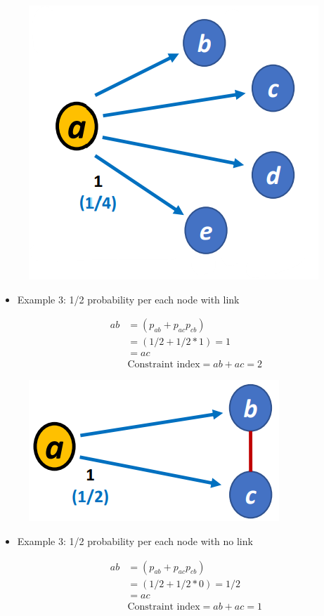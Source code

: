 \documentclass[
  notitlepage,
  onecolumn,
  openany]{book}
\begin{document}
\begin{figure}[h!]

{\centering \includegraphics[width=0.4\linewidth]{images/08-Metrics for structural holes/Untitled 1} 

}

\end{figure}

\begin{itemize}
\item
  Example 3: 1/2 probability per each node with link

  \[
    \begin{aligned}
    ab &= (p_{ab}+p_{ac}p_{cb})
    \\&= (1/2+1/2*1)=1\\
    & = ac\\
    &\text{Constraint index} = ab+ac= 2
    \end{aligned}
    \]
\end{itemize}

\begin{figure}[h!]

{\centering \includegraphics[width=0.4\linewidth]{images/08-Metrics for structural holes/Untitled 2} 

}

\end{figure}

\begin{itemize}
\item
  Example 3: 1/2 probability per each node with no link

  \[
    \begin{aligned}
    ab &= (p_{ab}+p_{ac}p_{cb})
    \\&= (1/2+1/2*0)=1/2\\
    & = ac\\
    &\text{Constraint index} = ab+ac= 1
    \end{aligned}
    \]
\end{itemize}
\end{document}
